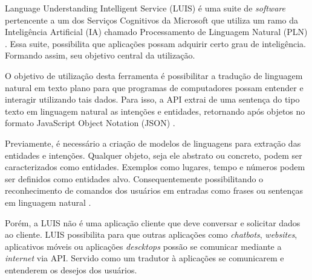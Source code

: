 Language Understanding Intelligent Service (LUIS) é uma suite de \textit{software} pertencente a um dos Serviços Cognitivos da Microsoft que utiliza um ramo da Inteligência Artificial (IA) chamado Processamento de Linguagem Natural (PLN) \cite{Mayo:2017}. Essa suite, possibilita que aplicações possam adquirir certo grau de inteligência. Formando assim, seu objetivo central da utilização.

O objetivo de utilização desta ferramenta é possibilitar a tradução de linguagem natural em texto plano para que programas de computadores possam entender e interagir utilizando tais dados. Para isso, a API extrai de uma sentença do tipo texto em linguagem natural as intenções e entidades, retornando após objetos no formato JavaScript Object Notation (JSON) \cite{Mayo:2017}.

Previamente, é necessário a criação de modelos de linguagens para extração das entidades e intenções. Qualquer objeto, seja ele abstrato ou concreto, podem ser caracterizados como entidades. Exemplos como lugares, tempo e números podem ser definidos como entidades alvo. Consequentemente possibilitando o reconhecimento de comandos dos usuários em entradas como frases ou sentenças em linguagem natural \cite{Larsen:2017}.

Porém, a LUIS não é uma aplicação cliente que deve conversar e solicitar dados ao cliente. LUIS possibilita para que outras aplicações como \textit{chatbots}, \textit{websites}, aplicativos móveis ou aplicações \textit{descktops} possão se comunicar mediante a \textit{internet} via API. Servido como um tradutor à aplicações se comunicarem e entenderem os desejos dos usuários.
